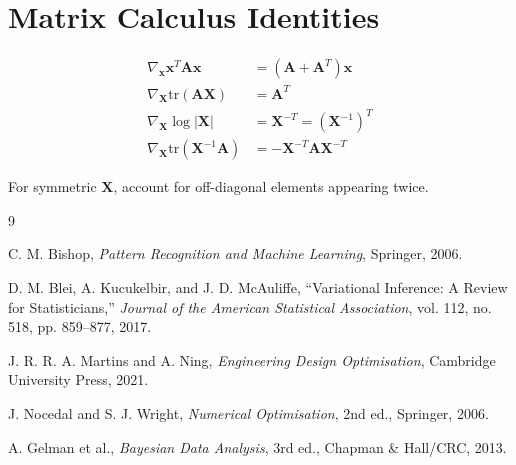 \documentclass[11pt]{article}
\newcommand{\tr}{\text{tr}}
\begin{document}
\section{Matrix Calculus Identities}

\begin{align}
\nabla_{\bm{x}} \bm{x}^T\bm{A}\bm{x} &= (\bm{A} + \bm{A}^T)\bm{x}\\
\nabla_{\bm{X}} \tr(\bm{A}\bm{X}) &= \bm{A}^T\\
\nabla_{\bm{X}} \log |\bm{X}| &= \bm{X}^{-T} = (\bm{X}^{-1})^T\\
\nabla_{\bm{X}} \tr(\bm{X}^{-1}\bm{A}) &= -\bm{X}^{-T}\bm{A}\bm{X}^{-T}
\end{align}

For symmetric $\bm{X}$, account for off-diagonal elements appearing twice.


\begin{thebibliography}{9}

C. M. Bishop, \textit{Pattern Recognition and Machine Learning}, Springer, 2006.

D. M. Blei, A. Kucukelbir, and J. D. McAuliffe, ``Variational Inference: A Review for Statisticians,'' \textit{Journal of the American Statistical Association}, vol. 112, no. 518, pp. 859--877, 2017.

J. R. R. A. Martins and A. Ning, \textit{Engineering Design Optimisation}, Cambridge University Press, 2021.

J. Nocedal and S. J. Wright, \textit{Numerical Optimisation}, 2nd ed., Springer, 2006.

A. Gelman et al., \textit{Bayesian Data Analysis}, 3rd ed., Chapman \& Hall/CRC, 2013.

\end{thebibliography}
\end{document}
